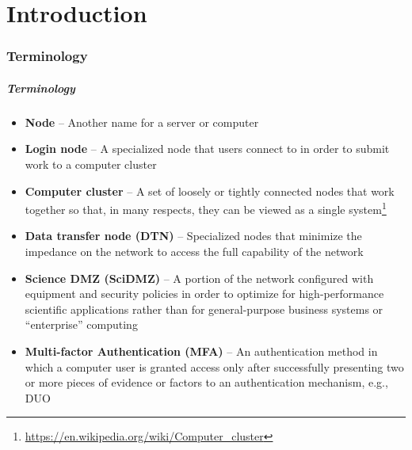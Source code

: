 \part{Introduction}
\begin{frame}
			 \partpage
\end{frame}

\section[Terminology]{Terminology}

\begin{frame}
	\frametitle{Terminology}
	\begin{itemize}
	\item \textbf{Node} -- Another name for a server or computer
        \item \textbf{Login node} -- A specialized node that users connect to in order to submit work to a computer cluster
        \item \textbf{Computer cluster} -- A set of loosely or tightly connected nodes that work together so that, in many respects, they can be viewed as a single system\footnote{\label{wiki_ccluster}\tiny\url{https://en.wikipedia.org/wiki/Computer_cluster}}
        \item \textbf{Data transfer node (DTN)} -- Specialized nodes that minimize the impedance on the network to access the full capability of the network
	\item \textbf{Science DMZ (SciDMZ)} --  A portion of the network configured with equipment and security policies in order to optimize for high-performance scientific applications rather than for general-purpose business systems or “enterprise” computing 
	\item \textbf{Multi-factor Authentication (MFA)} -- An authentication method in which a computer user is granted access only after successfully presenting two or more pieces of evidence or factors to an authentication mechanism, e.g., DUO

	\end{itemize}
\end{frame}


